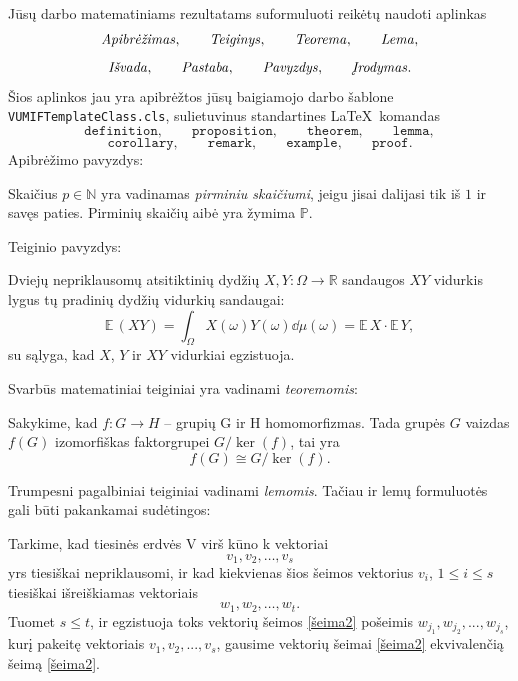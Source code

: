 \documentclass[]{VUMIFTemplateClass}
\newcommand{\EE}{\mathbb{E}\,}
\begin{document}
Jūsų darbo matematiniams rezultatams suformuluoti reikėtų naudoti aplinkas
\[
\text{\emph{Apibrėžimas}},\qquad \text{\emph{Teiginys}}, \qquad \text{\emph{Teorema}}, \qquad \text{\emph{Lema}},
\]
\[
\text{\emph{Išvada}}, \qquad \text{\emph{Pastaba}}, \qquad  \text{\emph{Pavyzdys}}, \qquad \text{\emph{Įrodymas}}.
\]
Šios aplinkos jau yra apibrėžtos
jūsų baigiamojo darbo šablone \texttt{VUMIFTemplateClass.cls}, sulietuvinus standartines \LaTeX\  komandas
\[
\texttt{definition}, \qquad \texttt{proposition}, \qquad \texttt{theorem}, \qquad \texttt{lemma},
\]
\[
\texttt{corollary}, \qquad \texttt{remark}, \qquad \texttt{example}, \qquad \texttt{proof}.
\]
\noindent Apibrėžimo pavyzdys:
\begin{definition}
Skaičius $p \in \mathbb{N}$ yra vadinamas \emph{pirminiu skaičiumi}, jeigu jisai dalijasi tik iš $1$ ir savęs paties. Pirminių skaičių aibė yra žymima $\mathbb{P}$.
\end{definition}
\noindent Teiginio pavyzdys:
\begin{proposition}
Dviejų nepriklausomų atsitiktinių dydžių $X, Y: \Omega \to \mathbb{R}$ sandaugos $XY$ vidurkis lygus tų pradinių dydžių vidurkių sandaugai:
\[
\EE{(XY)}=\int_{\Omega} X(\omega)Y(\omega)\dd\mu(\omega) = \EE{X} \cdot \EE{Y},
\]
su sąlyga, kad $X$, $Y$ ir $XY$ vidurkiai egzistuoja.
\end{proposition}

\noindent  Svarbūs matematiniai teiginiai yra vadinami \emph{teoremomis}:
\begin{theorem}\label{teor1}
    Sakykime, kad $f: G {\rightarrow} H$ – grupių G ir H homomorfizmas. Tada grupės $G$ vaizdas $f(G)$ izomorfiškas faktorgrupei $G / \ker{(f)}$, tai yra
    \[
        f(G) \cong G \big / \ker{(f)}.
    \]
\end{theorem}

\noindent Trumpesni pagalbiniai teiginiai vadinami \emph{lemomis}. Tačiau ir lemų formuluotės gali būti pakankamai sudėtingos:
\begin{lemma}\label{lem1}
    Tarkime, kad tiesinės erdvės V virš kūno k vektoriai
    \begin{equation}\label{šeima1}
        v_1, v_2, \dots, v_s
    \end{equation}
    yrs tiesiškai nepriklausomi, ir kad kiekvienas šios šeimos vektorius $v_i$, $1 \leq i \leq s$ tiesiškai išreiškiamas vektoriais
    \begin{equation}\label{šeima2}
        w_1, w_2, \dots, w_t.
    \end{equation}
    Tuomet $s \leq t$, ir egzistuoja toks vektorių šeimos \eqref{šeima2} pošeimis $w_{j_1}, w_{j_2} ,  . . . , w_{j_s}$, kurį pakeitę vektoriais $v_1, v_2, . . . , v_s$, gausime vektorių šeimai \eqref{šeima2} ekvivalenčią šeimą \eqref{šeima2}.
\end{lemma}
\end{document}
